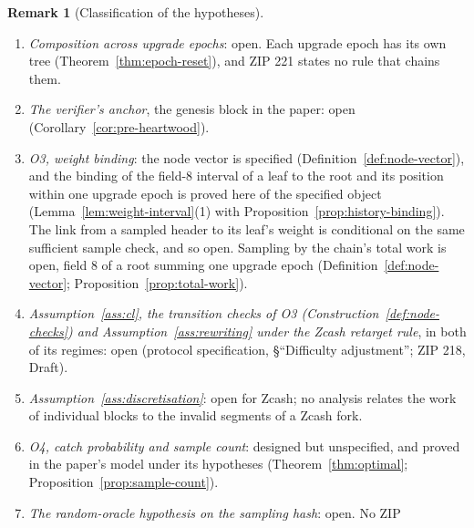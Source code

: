 \documentclass[11pt,a4paper]{article}
\theoremstyle{definition}
\newtheorem{remark}[theorem]{Remark}
\begin{document}
\begin{remark}[Classification of the hypotheses]
\begin{enumerate}[label=(\arabic*)]
  specified (Definition~\ref{def:commitment-rule}), and the property is
  proved here of the specified object
  (Proposition~\ref{prop:history-binding}); no normative text fixes the
  property. \emph{O2, fork structure for ZIP 221 trees}: open, since it is
  conditional on a sufficient sample check for those trees, which no
  specification or result supplies
  (Proposition~\ref{prop:zcash-sample}); Lemmas~\ref{lem:no-honest}
  and~\ref{lem:no-reuse} are stated for the paper's construction only.
  Hypothesis~6 of Theorem~\ref{thm:flyclient}, leaf--internal separation,
  enters only through Lemma~\ref{lem:no-honest} and shares the class of O2:
  it is stated for the paper's construction, and for ZIP 221 trees no
  specification or result supplies its counterpart.
\item \emph{Composition across upgrade epochs}: open. Each upgrade epoch has
  its own tree (Theorem~\ref{thm:epoch-reset}), and ZIP 221 states no rule
  that chains them.
\item \emph{The verifier's anchor}, the genesis block in the paper: open
  (Corollary~\ref{cor:pre-heartwood}).
\item \emph{O3, weight binding}: the node vector is specified
  (Definition~\ref{def:node-vector}), and the binding of the field-$8$
  interval of a leaf to the root and its position within one upgrade epoch
  is proved here of the specified object
  (Lemma~\ref{lem:weight-interval}(1) with
  Proposition~\ref{prop:history-binding}). The link from a sampled header to
  its leaf's weight is conditional on the same sufficient sample check, and
  so open. Sampling by the chain's total work is open, field $8$ of a root
  summing one upgrade epoch (Definition~\ref{def:node-vector};
  Proposition~\ref{prop:total-work}).
\item \emph{Assumption~\ref{ass:cl}, the transition checks of O3
  (Construction~\ref{def:node-checks}) and Assumption~\ref{ass:rewriting}
  under the Zcash retarget rule}, in both of its regimes: open (protocol
  specification, \S``Difficulty adjustment''; ZIP 218, Draft).
\item \emph{Assumption~\ref{ass:discretisation}}: open for Zcash; no
  analysis relates the work of individual blocks to the invalid segments of
  a Zcash fork.
\item \emph{O4, catch probability and sample count}: designed but
  unspecified, and proved in the paper's model under its hypotheses
  (Theorem~\ref{thm:optimal}; Proposition~\ref{prop:sample-count}).
\item \emph{The random-oracle hypothesis on the sampling hash}: open. No ZIP

\end{enumerate}
\end{remark}
\end{document}
